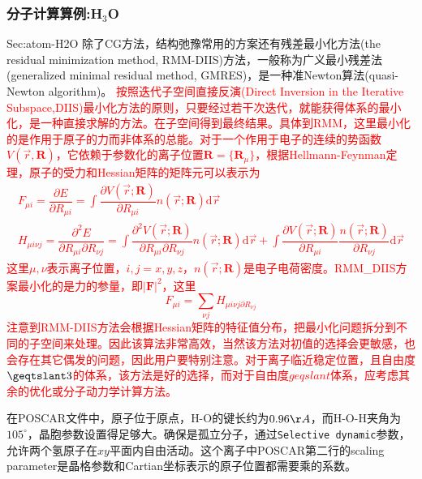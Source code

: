 \subsubsection{分子计算算例:\rm{H$_3$O}}{Sec:atom-H2O}
除了\textrm{CG}方法，结构弛豫常用的方案还有残差最小化方法\textrm{(the residual minimization method, RMM-DIIS)}方法，一般称为广义最小残差法\textrm{(generalized minimal residual method, GMRES)}，是一种准\textrm{Newton}算法\textrm{(quasi-Newton algorithm)}。
\textcolor{red}{按照迭代子空间直接反演\textrm{(Direct Inversion in the Iterative Subspace,DIIS)}最小化方法的原则，只要经过若干次迭代，就能获得体系的最小化，是一种直接求解的方法。在子空间得到最终结果。具体到\textrm{RMM}，这里最小化的是作用于原子的力而非体系的总能。对于一个作用于电子的连续的势函数$V(\vec r,\mathbf{R})$，它依赖于参数化的离子位置$\mathbf{R}=\{\mathbf{R}_{\mu}\}$，根据\textrm{Hellmann-Feynman}定理，原子的受力和\textrm{Hessian}矩阵的矩阵元可以表示为
\begin{displaymath}
	\begin{aligned}
		F_{\mu i}=\dfrac{\partial E}{\partial R_{\mu i}}=\int\dfrac{\partial V(\vec r;\mathbf{R})}{\partial R_{\mu i}}n(\vec r;\mathbf{R})\mathrm{d}\vec r\\
		H_{\mu i\nu j}=\dfrac{\partial^2E}{\partial R_{\mu i}\partial R_{\nu j}}=\int\dfrac{\partial^2V(\vec r;\mathbf{R})}{\partial R_{\mu i}\partial R_{\nu j}}n(\vec r;\mathbf{R})\mathrm{d}\vec  r+\int\dfrac{\partial V(\vec r;\mathbf{R})}{\partial R_{\mu i}}\dfrac{n(\vec r;\mathbf{R})}{\partial R_{\nu j}}\mathrm{d}\vec r
	\end{aligned}
\end{displaymath}
这里$\mu,\nu$表示离子位置，$i,j=x,y,z$，$n(\vec r;\mathbf{R})$是电子电荷密度。\textrm{RMM_DIIS}方案最小化的是力的参量，即$|\mathbf{F}|^2$，这里
\begin{displaymath}
	F_{\mu i}=\sum_{\nu j}H_{\mu i\nu j\partial R_{\nu j}}
\end{displaymath}
注意到\textrm{RMM-DIIS}方法会根据\textrm{Hessian}矩阵的特征值分布，把最小化问题拆分到不同的子空间来处理。因此该算法非常高效，当然该方法对初值的选择会更敏感，也会存在其它偶发的问题，因此用户要特别注意。对于离子临近稳定位置，且自由度$\geqtslant3$的体系，该方法是好的选择，而对于自由度$geqslant$体系，应考虑其余的优化或分子动力学计算方法。}

在\textrm{POSCAR}文件中，原子位于原点，\textrm{H-O}的键长约为$0.96\AA$，而\textrm{H-O-H}夹角为$105^{\circ}$，晶胞参数设置得足够大。确保是孤立分子，通过\texttt{Selective dynamic}参数，允许两个氢原子在$xy$平面内自由活动。这个离子中\textrm{POSCAR}第二行的\textrm{scaling parameter}是晶格参数和\textrm{Cartian}坐标表示的原子位置都需要乘的系数。

